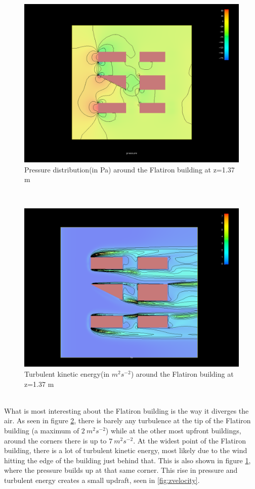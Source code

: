 \begin{figure}[h!]
\centering
\includegraphics[width = \textwidth]{zpressure.png}
\caption{Pressure distribution(in Pa) around the Flatiron building at z=1.37 m}
\label{fig:zpressure}
\end{figure}\\
\begin{figure}[h!]
\centering
\includegraphics[width = \textwidth]{zenergy.png}
\caption{Turbulent kinetic energy(in $m^2s^{-2}$) around the Flatiron building at z=1.37 m}
\label{fig:zenergy}
\end{figure}\\
What is most interesting about the Flatiron building is the way it diverges the air. As seen in figure \ref{fig:zenergy}, there is barely any turbulence at the tip of the Flatiron building (a maximum of $2~m^2s^{-2}$) while at the other most upfront buildings, around the corners there is up to $7~m^2s^{-2}$. At the widest point of the Flatiron building, there is a lot of turbulent kinetic energy, most likely due to the wind hitting the edge of the building just behind that. This is also shown in figure \ref{fig:zpressure}, where the pressure builds up at that same corner. This rise in pressure and turbulent energy creates a small updraft, seen in \ref{fig:zvelocity}.\\
